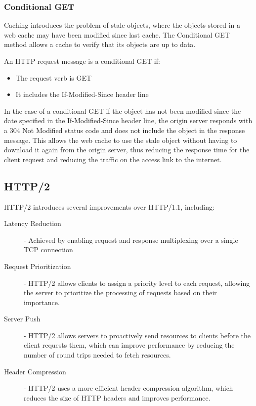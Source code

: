 \documentclass[12pt letter]{report}
\begin{document}
\subsubsection{Conditional GET}

Caching introduces the problem of stale objects, where the objects
stored in a web cache may have been modified since last cache. The
Conditional GET method allows a cache to verify that its objects are up to data.

An HTTP request message is a conditional GET if:
\begin{itemize}
  \item The request verb is GET
  \item It includes the If-Modified-Since header line
\end{itemize}

In the case of a conditional GET if the object has not been modified
since the date specified in the If-Modified-Since header line, the
origin server responds with a 304 Not Modified status code and does
not include the object in the response message. This allows the web
cache to use the stale object without having to download it again
from the origin server, thus reducing the response time for the
client request and reducing the traffic on the access link to the internet.

\subsection{HTTP/2}

HTTP/2 introduces several improvements over HTTP/1.1, including:
\begin{description}
  \item[Latency Reduction]  - Achieved by enabling request and
    response multiplexing over a single TCP connection
  \item[Request Prioritization] - HTTP/2 allows clients to assign a
    priority level to each request, allowing the server to prioritize
    the processing of requests based on their importance.
  \item[Server Push] - HTTP/2 allows servers to proactively send
    resources to clients before the client requests them, which can
    improve performance by reducing the number of round trips needed
    to fetch resources.
  \item[Header Compression] - HTTP/2 uses a more efficient header
    compression algorithm, which reduces the size of HTTP headers and
    improves performance.
\end{description}
\end{document}
